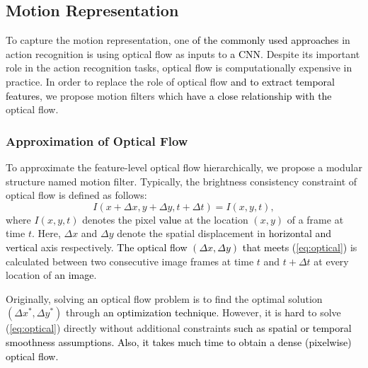 \documentclass[runningheads]{llncs}
\newcommand{\nj}[1]{\textcolor{black}{#1}}
\begin{document}
\subsection{Motion Representation}
To capture the motion representation, one \nj{of the commonly used approaches} in action recognition is using optical flow as inputs to \nj{a CNN}. Despite its important role in the action recognition tasks, optical flow is computationally expensive in practice. In order to replace the role of optical flow \nj{and to extract temporal features}, we propose motion filters which \nj{have a close relationship with the} optical flow.

\subsubsection{Approximation of Optical Flow}
To approximate the feature-level optical flow hierarchically, we propose a modular structure named motion filter. Typically, the brightness consistency constraint of optical flow is defined as follows:
\begin{equation}
 \label{eq:optical}
 {I}(x + \Delta x, y + \Delta y, t + \Delta t) = {I}(x,y,t),
\end{equation}
where ${I}(x,y,t)$ denotes the pixel \nj{value} at the location $(x,y)$ of a frame at time $t$. 
Here, $\Delta{x}$ and $\Delta{y}$ denote the spatial displacement in \nj{horizontal and vertical} axis respectively. 
\nj{The optical flow $(\Delta x, \Delta y)$ that meets (\ref{eq:optical})} 
is calculated between two consecutive image frames at time $t$ and $t+\Delta{t}$ at every location of \nj{an image}. 

Originally, solving \nj{an} optical flow problem is to find the optimal solution $(\Delta{x}^{\ast},\Delta{y}^{\ast})$ through \nj{an optimization technique}. However, it is \nj{hard} to solve (\ref{eq:optical}) directly without additional constraints \nj{such as spatial or temporal smoothness assumptions. Also, it takes much time to obtain a dense (pixelwise) optical flow.} 
\end{document}

